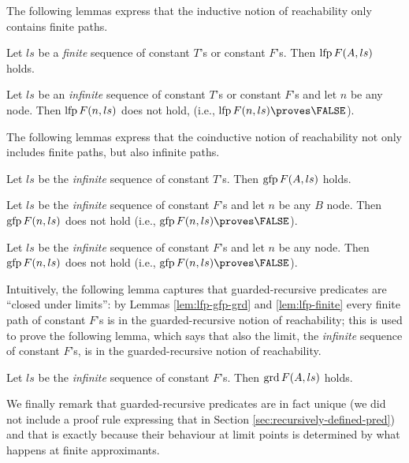 The following lemmas express that the inductive notion of reachability
only contains finite paths. 

\begin{lemma}
  \label{lem:lfp-finite}
  Let $ls$ be a \emph{finite} sequence of constant $T$'s or constant $F$'s.
  Then $\operatorname{lfp} F (A,ls)$ holds.
\end{lemma}

\begin{lemma}
  \label{lem:lfp-infinite}
  Let $ls$ be an \emph{infinite} sequence of constant $T$'s or constant $F$'s and let $n$ be any node.
  Then $\operatorname{lfp} F (n,ls)$ does not hold, (i.e., $\lfp F (n,ls) \proves \FALSE$).
\end{lemma}

The following lemmas express that the coinductive notion of reachability
not only includes finite paths, but also infinite paths.


\begin{lemma}
  Let $ls$ be the \emph{infinite} sequence of constant $T$'s.
  Then $\operatorname{gfp} F (A,ls)$ holds.
\end{lemma}

\begin{lemma}
  Let $ls$ be the \emph{infinite} sequence of constant $F$'s and let $n$ be any $B$ node.
  Then $\operatorname{gfp} F (n,ls)$ does not hold (i.e., $\gfp F (n,ls) \proves \FALSE$).
\end{lemma}

\begin{lemma}
  Let $ls$ be the \emph{infinite} sequence of constant $F$'s and let $n$ be any node.
  Then $\operatorname{gfp} F (n,ls)$ does not hold (i.e., $\gfp F (n,ls) \proves \FALSE$).
\end{lemma}

Intuitively, the following lemma captures that guarded-recursive predicates are ``closed under limits'':
by Lemmas \ref{lem:lfp-gfp-grd} and \ref{lem:lfp-finite} every finite path of constant $F$'s is in the guarded-recursive notion of reachability;
this is used to prove the following lemma, which says that also the limit, the \emph{infinite} sequence of constant $F$'s, is in the guarded-recursive notion of reachability.

\begin{lemma}
  Let $ls$ be the \emph{infinite} sequence of constant $F$'s.
  Then $\operatorname{grd} F (A,ls)$ holds.
\end{lemma}

We finally remark that guarded-recursive predicates are in fact unique (we did not include a proof rule expressing that in Section \ref{sec:recursively-defined-pred}) and that is exactly because their behaviour at limit points is determined by what happens at finite approximants.


